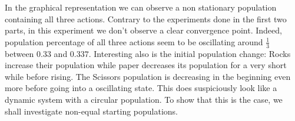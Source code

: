 \documentclass[a4paper, 11pt]{article}
\begin{document}
\begin{landscape}
In the graphical representation we can observe a non stationary population containing all three actions. Contrary to the experiments done in the first two parts, in this experiment we don't observe a clear convergence point. Indeed, population percentage of all three actions seem to be oscillating around $\frac{1}{3}$ between $0.33$ and $0.337$. Interesting also is the initial population change: Rocks increase their population while paper decreases its population for a very short while before rising. The Scissors population is decreasing in the beginning even more before going into a oscillating state. This does suspiciously look like a dynamic system with a circular population. To show that this is the case, we shall investigate non-equal starting populations.

\end{landscape}
\end{document}
